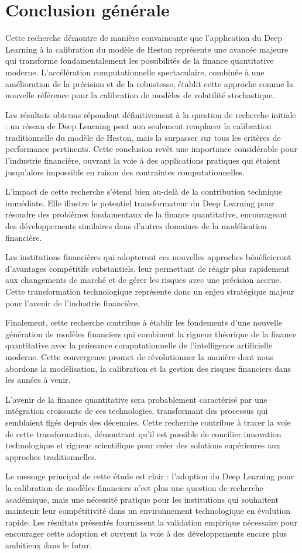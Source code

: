 \section{Conclusion générale}

Cette recherche démontre de manière convaincante que l'application du Deep Learning à la calibration du modèle de Heston représente une avancée majeure qui transforme fondamentalement les possibilités de la finance quantitative moderne. L'accélération computationnelle spectaculaire, combinée à une amélioration de la précision et de la robustesse, établit cette approche comme la nouvelle référence pour la calibration de modèles de volatilité stochastique.

Les résultats obtenus répondent définitivement à la question de recherche initiale : un réseau de Deep Learning peut non seulement remplacer la calibration traditionnelle du modèle de Heston, mais la surpasser sur tous les critères de performance pertinents. Cette conclusion revêt une importance considérable pour l'industrie financière, ouvrant la voie à des applications pratiques qui étaient jusqu'alors impossible en raison des contraintes computationnelles.

L'impact de cette recherche s'étend bien au-delà de la contribution technique immédiate. Elle illustre le potentiel transformateur du Deep Learning pour résoudre des problèmes fondamentaux de la finance quantitative, encourageant des développements similaires dans d'autres domaines de la modélisation financière.

Les institutions financières qui adopteront ces nouvelles approches bénéficieront d'avantages compétitifs substantiels, leur permettant de réagir plus rapidement aux changements de marché et de gérer les risques avec une précision accrue. Cette transformation technologique représente donc un enjeu stratégique majeur pour l'avenir de l'industrie financière.

Finalement, cette recherche contribue à établir les fondements d'une nouvelle génération de modèles financiers qui combinent la rigueur théorique de la finance quantitative avec la puissance computationnelle de l'intelligence artificielle moderne. Cette convergence promet de révolutionner la manière dont nous abordons la modélisation, la calibration et la gestion des risques financiers dans les années à venir.

L'avenir de la finance quantitative sera probablement caractérisé par une intégration croissante de ces technologies, transformant des processus qui semblaient figés depuis des décennies. Cette recherche contribue à tracer la voie de cette transformation, démontrant qu'il est possible de concilier innovation technologique et rigueur scientifique pour créer des solutions supérieures aux approches traditionnelles.

Le message principal de cette étude est clair : l'adoption du Deep Learning pour la calibration de modèles financiers n'est plus une question de recherche académique, mais une nécessité pratique pour les institutions qui souhaitent maintenir leur compétitivité dans un environnement technologique en évolution rapide. Les résultats présentés fournissent la validation empirique nécessaire pour encourager cette adoption et ouvrent la voie à des développements encore plus ambitieux dans le futur.
